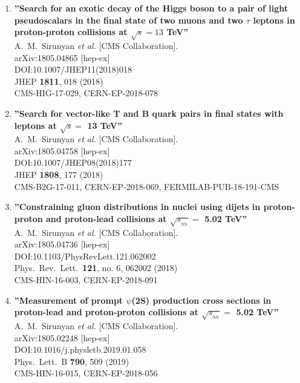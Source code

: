 \begin{enumerate}
\item%
{\bf ''Search for an exotic decay of the Higgs boson to a pair of light pseudoscalars in the final state of two muons and two $\tau$ leptons in proton-proton collisions at $ \sqrt{s}=13 $ TeV''}
  \\{}A.~M.~Sirunyan {\it et al.} [CMS Collaboration].
  \\{}arXiv:1805.04865 [hep-ex]
  \\{}DOI:10.1007/JHEP11(2018)018
  \\{}JHEP {\bf 1811}, 018 (2018)
  \\{}CMS-HIG-17-029, CERN-EP-2018-078

\item%
{\bf ''Search for vector-like T and B quark pairs in final states with leptons at $\sqrt{s} =$ 13 TeV''}
  \\{}A.~M.~Sirunyan {\it et al.} [CMS Collaboration].
  \\{}arXiv:1805.04758 [hep-ex]
  \\{}DOI:10.1007/JHEP08(2018)177
  \\{}JHEP {\bf 1808}, 177 (2018)
  \\{}CMS-B2G-17-011, CERN-EP-2018-069, FERMILAB-PUB-18-191-CMS

\item%
{\bf ''Constraining gluon distributions in nuclei using dijets in proton-proton and proton-lead collisions at $\sqrt{s_{_\mathrm{NN}}} =$ 5.02 TeV''}
  \\{}A.~M.~Sirunyan {\it et al.} [CMS Collaboration].
  \\{}arXiv:1805.04736 [hep-ex]
  \\{}DOI:10.1103/PhysRevLett.121.062002
  \\{}Phys.\ Rev.\ Lett.\  {\bf 121}, no. 6, 062002 (2018)
  \\{}CMS-HIN-16-003, CERN-EP-2018-091

\item%
{\bf ''Measurement of prompt $\psi$(2S) production cross sections in proton-lead and proton-proton collisions at $\sqrt{s_{_\mathrm{NN}}}=$ 5.02 TeV''}
  \\{}A.~M.~Sirunyan {\it et al.} [CMS Collaboration].
  \\{}arXiv:1805.02248 [hep-ex]
  \\{}DOI:10.1016/j.physletb.2019.01.058
  \\{}Phys.\ Lett.\ B {\bf 790}, 509 (2019)
  \\{}CMS-HIN-16-015, CERN-EP-2018-056


\end{enumerate}
